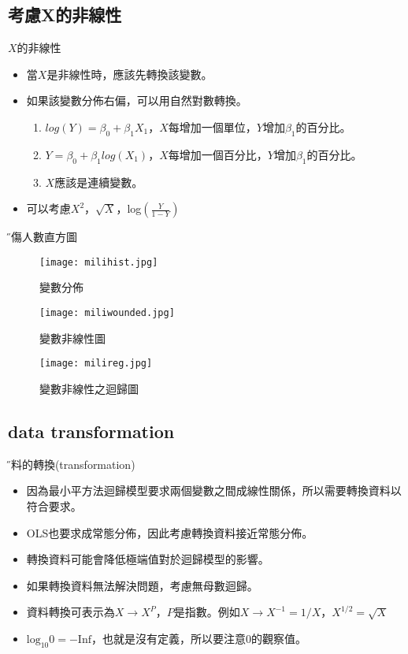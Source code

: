 \documentclass[xcolor=dvipsnames]{beamer}
\begin{document}
\subsection{考慮X的非線性}
\begin{frame}{$X$的非線性}
\begin{itemize}
\item 當$X$是非線性時，應該先轉換該變數。
\item 如果該變數分佈右偏，可以用自然對數轉換。
\begin{enumerate}
\item $log(Y)=\beta_{0}+\beta_{1}X_{1}$，$X$每增加一個單位，$Y$增加$\beta_{1}$的百分比。
\item $Y=\beta_{0}+\beta_{1}log(X_{1})$，$X$每增加一個百分比，$Y$增加$\beta_{1}$的百分比。
\item $X$應該是連續變數。
\end{enumerate}
\item 可以考慮$X^2$，$\sqrt{X}$，log$(\frac{Y}{1-Y})$
\end{itemize}
\end{frame}
\begin{frame}{\H 受傷人數直方圖}
\begin{figure}
\texttt{[image: milihist.jpg]}
\caption{變數分佈}
\end{figure}
\end{frame}
\begin{frame}
\begin{figure}
\texttt{[image: miliwounded.jpg]}
\caption{變數非線性圖}
\end{figure}
\end{frame}
\begin{frame}
\begin{figure}
\texttt{[image: milireg.jpg]}
\caption{變數非線性之迴歸圖}
\end{figure}
\end{frame}
\subsection{data transformation}
\begin{frame}{\H 資料的轉換(transformation)}
\begin{itemize}
\item 因為最小平方法迴歸模型要求兩個變數之間成線性關係，所以需要轉換資料以符合要求。
\item OLS也要求成常態分佈，因此考慮轉換資料接近常態分佈。
\item 轉換資料可能會降低極端值對於迴歸模型的影響。
\item 如果轉換資料無法解決問題，考慮無母數迴歸。
\item 資料轉換可表示為$X\rightarrow X^{P}$，$P$是指數。例如$X\rightarrow X^{-1}=1/X $，$ X^{1/2}=\sqrt{X} $
\item $\mathrm{log}_{10}0=\mathrm{-Inf}$，也就是沒有定義，所以要注意0的觀察值。
\end{itemize}
\end{frame}
\end{document}
